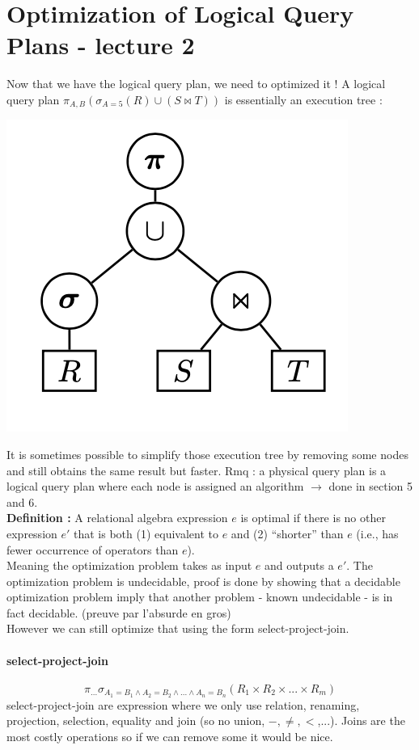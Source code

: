 \documentclass[12pt,a4paper]{article}
\begin{document}
\section{Optimization of Logical Query Plans - lecture 2}
Now that we have the logical query plan, we need to optimized it ! A logical query plan $\pi_{A,B}(\sigma_{A=5}(R)\cup(S \Join T))$ is essentially an execution tree :
\begin{center}
\includegraphics[scale=0.4]{img/img19.png}
\end{center}
It is sometimes possible to simplify those execution tree by removing some nodes and still obtains the same result but faster. Rmq : a physical query plan is a logical query plan where each node is assigned an algorithm $\rightarrow$ done in section 5 and 6.\\
\textbf{Definition :} A relational algebra expression $e$ is optimal if there is no other expression $e'$ that is both (1) equivalent to $e$ and (2) “shorter” than $e$ (i.e., has fewer occurrence of operators than $e$).\\
Meaning the optimization problem takes as input $e$ and outputs a $e'$.
The optimization problem is undecidable, proof is done by showing that a decidable optimization problem imply that another problem - known undecidable - is in fact decidable. (preuve par l'absurde en gros)\\
However we can still optimize that using the form select-project-join.

\paragraph{select-project-join}
$$\pi_{...}\sigma_{A_1=B_1 \wedge A_2=B_2 \wedge ... \wedge A_n = B_n}(R_1 \times R_2 \times ... \times R_m)$$
select-project-join are expression where we only use relation, renaming, projection, selection, equality and join (so no union, $-, \neq,<$,...). Joins are the most costly operations so if we can remove some it would be nice.\\
\end{document}
